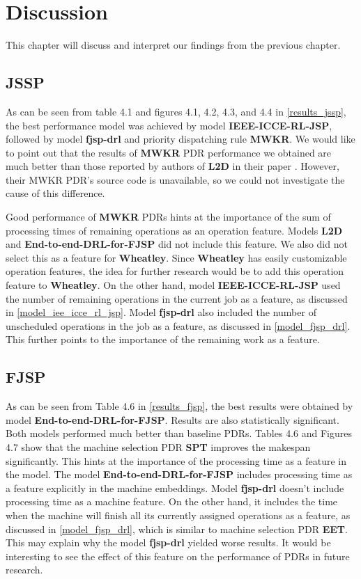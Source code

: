 \chapter{Discussion}

This chapter will discuss and interpret our findings from the previous chapter.

\section{JSSP} \label{discussion_jssp}
As can be seen from table 4.1 and figures 4.1, 4.2, 4.3, and 4.4 in \ref{results_jssp}, the best performance model was achieved by model \textbf{IEEE-ICCE-RL-JSP}, followed by model \textbf{fjsp-drl} and priority dispatching rule \textbf{MWKR}. We would like to point out that the results of \textbf{MWKR} PDR performance we obtained are much better than those reported by authors of \textbf{L2D} in their paper \cite{zhang2020learning}. However, their MWKR PDR's source code is unavailable, so we could not investigate the cause of this difference.
\par
Good performance of \textbf{MWKR} PDRs hints at the importance of the sum of processing times of remaining operations as an operation feature. Models \textbf{L2D} and \textbf{End-to-end-DRL-for-FJSP} did not include this feature. We also did not select this as a feature for \textbf{Wheatley}. Since \textbf{Wheatley} has easily customizable operation features, the idea for further research would be to add this operation feature to \textbf{Wheatley}. On the other hand, model \textbf{IEEE-ICCE-RL-JSP} used the number of remaining operations in the current job as a feature, as discussed in \ref{model_iee_icce_rl_jsp}. Model \textbf{fjsp-drl} also included the number of unscheduled operations in the job as a feature, as discussed in \ref{model_fjsp_drl}. This further points to the importance of the remaining work as a feature. 

\section{FJSP}
As can be seen from Table 4.6 in \ref{results_fjsp}, the best results were obtained by model \textbf{End-to-end-DRL-for-FJSP}. Results are also statistically significant. Both models performed much better than baseline PDRs. Tables 4.6 and Figures 4.7 show that the machine selection PDR \textbf{SPT} improves the makespan significantly. This hints at the importance of the processing time as a feature in the model. The model \textbf{End-to-end-DRL-for-FJSP} includes processing time as a feature explicitly in the machine embeddings. Model \textbf{fjsp-drl} doesn't include processing time as a machine feature. On the other hand, it includes the time when the machine will finish all its currently assigned operations as a feature, as discussed in \ref{model_fjsp_drl}, which is similar to machine selection PDR \textbf{EET}. This may explain why the model \textbf{fjsp-drl} yielded worse results. It would be interesting to see the effect of this feature on the performance of PDRs in future research.

